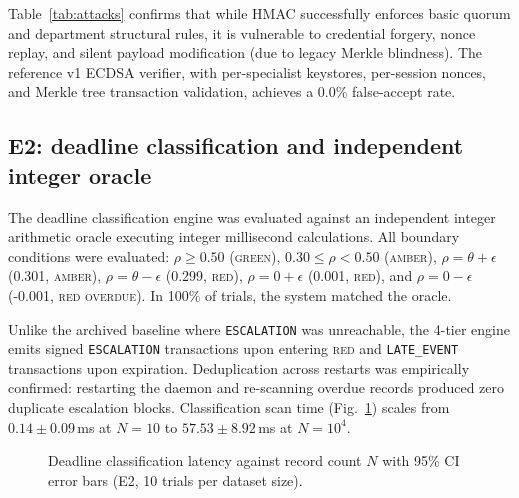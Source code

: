 \documentclass[journal]{IEEEtran}
\begin{document}
Table~\ref{tab:attacks} confirms that while HMAC successfully enforces basic quorum
and department structural rules, it is vulnerable to credential forgery, nonce
replay, and silent payload modification (due to legacy Merkle blindness).
The reference v1 ECDSA verifier, with per-specialist keystores, per-session
nonces, and Merkle tree transaction validation, achieves a 0.0\% false-accept rate.

\subsection{E2: deadline classification and independent integer oracle}
The deadline classification engine was evaluated against an independent integer
arithmetic oracle executing integer millisecond calculations. All boundary conditions
were evaluated: $\rho \ge 0.50$ (\textsc{green}), $0.30 \le \rho < 0.50$ (\textsc{amber}),
$\rho = \theta + \epsilon$ (0.301, \textsc{amber}), $\rho = \theta - \epsilon$ (0.299,
\textsc{red}), $\rho = 0 + \epsilon$ (0.001, \textsc{red}), and $\rho = 0 - \epsilon$
(-0.001, \textsc{red overdue}). In 100\% of trials, the system matched the oracle.

Unlike the archived baseline where \texttt{ESCALATION} was unreachable, the 4-tier
engine emits signed \texttt{ESCALATION} transactions upon entering \textsc{red} and
\texttt{LATE\_EVENT} transactions upon expiration. Deduplication across restarts was
empirically confirmed: restarting the daemon and re-scanning overdue records produced
zero duplicate escalation blocks. Classification scan time (Fig.~\ref{fig:e2a}) scales
from $0.14\pm0.09$\,ms at $N=10$ to $57.53\pm8.92$\,ms at $N=10^4$.

\begin{figure}[t]
\centering
{}
\caption{Deadline classification latency against record count $N$ with 95\% CI error bars (E2, 10 trials per dataset size).}
\label{fig:e2a}
\end{figure}
\end{document}
